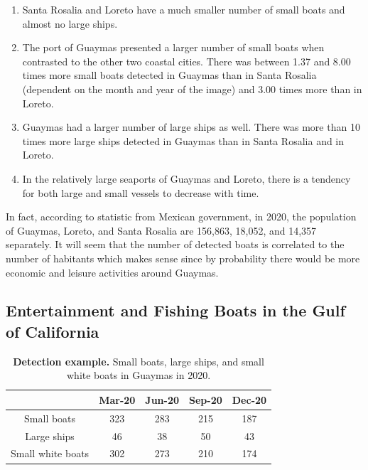 \begin{enumerate}
    \item Santa Rosalia and Loreto have a much smaller number of small boats and almost no large ships.
    \item The port of Guaymas presented a larger number of small boats when contrasted to the other two coastal cities. There was between 1.37 and 8.00 times more small boats detected in Guaymas than in Santa Rosalia (dependent on the month and year of the image) and 3.00 times more than in Loreto. 
    \item Guaymas had a larger number of large ships as well. There was more than 10 times more large ships detected in Guaymas than in Santa Rosalia and in Loreto.
    \item In the relatively large seaports of Guaymas and Loreto, there is a tendency for both large and small vessels to decrease with time.
\end{enumerate}

In fact, according to statistic\cite{INEGI2022Population} from Mexican government, in 2020, the population of Guaymas, Loreto, and Santa Rosalia are 156,863, 18,052, and 14,357 separately. It will seem that the number of detected boats is correlated to the number of habitants which makes sense since by probability there would be more economic and leisure activities around Guaymas.


\subsection{Entertainment and Fishing Boats in the Gulf of California}



\begin{table}[t]
\center
\begin{tabular}{|c|c|c|c|c|}
\hline
                                &  Mar-20   & Jun-20    & Sep-20    & Dec-20\\ \hline
   Small boats                  &  323      & 283       & 215       & 187   \\ \hline
   Large ships                  &  46       & 38        & 50        & 43    \\ \hline
   Small white boats            &  302      & 273       & 210       & 174   \\ \hline
\end{tabular}
\caption{\textbf{Detection example.} Small boats, large ships, and small white boats in Guaymas in 2020.}
\label{Guaymas_2020}
\end{table}

